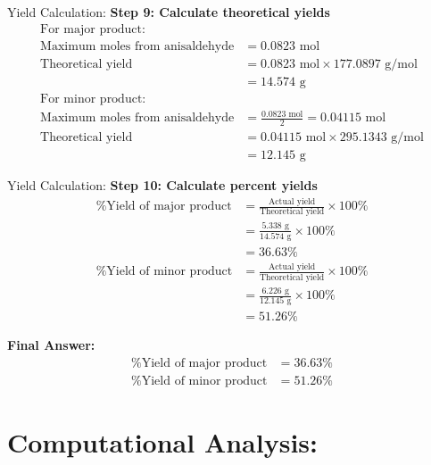 \documentclass[aspectratio=169, 9pt]{beamer}
\begin{document}
\begin{frame}{Yield Calculation:}
\textbf{Step 9: Calculate theoretical yields}
\begin{align}
\text{For major product:} \\
\text{Maximum moles from anisaldehyde} &= 0.0823 \text{ mol} \\
\text{Theoretical yield} &= 0.0823 \text{ mol} \times 177.0897 \text{ g/mol} \\
&= 14.574 \text{ g} \\
\text{For minor product:} \\
\text{Maximum moles from anisaldehyde} &= \frac{0.0823 \text{ mol}}{2} = 0.04115 \text{ mol} \\
\text{Theoretical yield} &= 0.04115 \text{ mol} \times 295.1343 \text{ g/mol} \\
&= 12.145 \text{ g}
\end{align}
\end{frame}
\begin{frame}{Yield Calculation:}
\textbf{Step 10: Calculate percent yields}
\begin{align}
\text{\% Yield of major product} &= \frac{\text{Actual yield}}{\text{Theoretical yield}} \times 100\% \\
&= \frac{5.338 \text{ g}}{14.574 \text{ g}} \times 100\% \\
&= 36.63\% \\
\text{\% Yield of minor product} &= \frac{\text{Actual yield}}{\text{Theoretical yield}} \times 100\% \\
&= \frac{6.226 \text{ g}}{12.145 \text{ g}} \times 100\% \\
&= 51.26\%
\end{align}

\textbf{Final Answer:}
\begin{align}
\text{\% Yield of major product} &= 36.63\% \\
\text{\% Yield of minor product} &= 51.26\%
\end{align}
    
\end{frame}

\section{Computational Analysis: }
\end{document}
